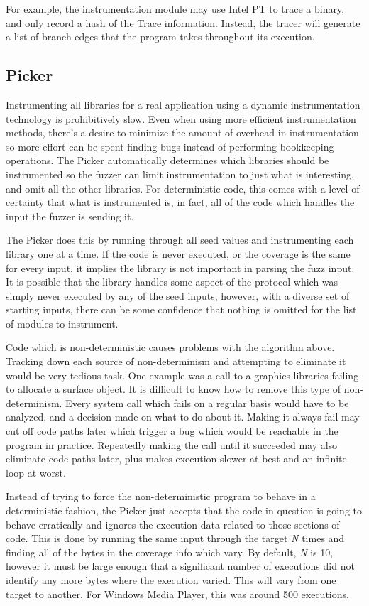 For example, the instrumentation module may use Intel PT to trace a binary, and
only record a hash of the Trace information.  Instead, the tracer will generate
a list of branch edges that the program takes throughout its execution.

\subsection{Picker} \label{Picker}
Instrumenting all libraries for a real application using a dynamic
instrumentation technology is prohibitively slow. Even when using more
efficient instrumentation methods, there's a desire to minimize the amount of
overhead in instrumentation so more effort can be spent finding bugs instead of
performing bookkeeping operations.  The Picker automatically determines which
libraries should be instrumented so the fuzzer can limit instrumentation to
just what is interesting, and omit all the other libraries. For deterministic
code, this comes with a level of certainty that what is instrumented is, in
fact, all of the code which handles the input the fuzzer is sending it.

The Picker does this by running through all seed values and instrumenting each
library one at a time. If the code is never executed, or the coverage is the
same for every input, it implies the library is not important in parsing the
fuzz input.  It is possible that the library handles some aspect of the
protocol which was simply never executed by any of the seed inputs, however,
with a diverse set of starting inputs, there can be some confidence that
nothing is omitted for the list of modules to instrument.

Code which is non-deterministic causes problems with the algorithm above.
Tracking down each source of non-determinism and attempting to eliminate it
would be very tedious task. One example was a call to a graphics libraries
failing to allocate a surface object. It is difficult to know how to remove
this type of non-determinism. Every system call which fails on a regular
basis would have to be analyzed, and a decision made on what to do about it.
Making it always fail may cut off code paths later which trigger a bug which
would be reachable in the program in practice.  Repeatedly making the call
until it succeeded may also eliminate code paths later, plus makes execution
slower at best and an infinite loop at worst.

Instead of trying to force the non-deterministic program to behave in a
deterministic fashion, the Picker just accepts that the code in question is
going to behave erratically and ignores the execution data related to those
sections of code.  This is done by running the same input through the target
\textit{N} times and finding all of the bytes in the coverage info which
vary. By default, \textit{N} is 10, however it must be large enough that a
significant number of executions did not identify any more bytes where the
execution varied. This will vary from one target to another.  For Windows
Media Player, this was around 500 executions.  %

